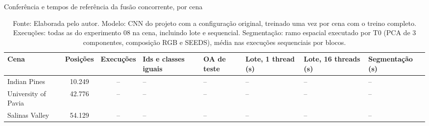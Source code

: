 \begin{table}[H]
    \centering
    \caption{Conferência e tempos de referência da fusão concorrente, por cena}
    \small
    \setlength{\tabcolsep}{3pt}
    \begin{tabular}{|l|c|c|C{1.6cm}|C{1.3cm}|C{1.5cm}|C{1.6cm}|C{2.0cm}|}
        \hline
        \textbf{Cena} & \textbf{Posições} & \textbf{Execuções} & \textbf{Ids e classes iguais} & \textbf{OA de teste} & \textbf{Lote, 1 thread (s)} & \textbf{Lote, 16 threads (s)} & \textbf{\mbox{Segmentação} (s)} \\
        \hline
        Indian Pines & 10.249 & -- & -- & -- & -- & -- & -- \\ \hline
        University of Pavia & 42.776 & -- & -- & -- & -- & -- & -- \\ \hline
        Salinas Valley & 54.129 & -- & -- & -- & -- & -- & -- \\ \hline
    \end{tabular}
    \captionsetup{justification=raggedright}
    \caption*{Fonte: Elaborada pelo autor. Modelo: CNN do projeto com a configuração original, treinado uma vez por cena com o treino completo. Execuções: todas as do experimento 08 na cena, incluindo lote e sequencial. Segmentação: ramo espacial executado por T0 (PCA de 3 componentes, composição RGB e SEEDS), média nas execuções sequenciais por blocos. }
    \label{tab:fusaoConferencia}
\end{table}

